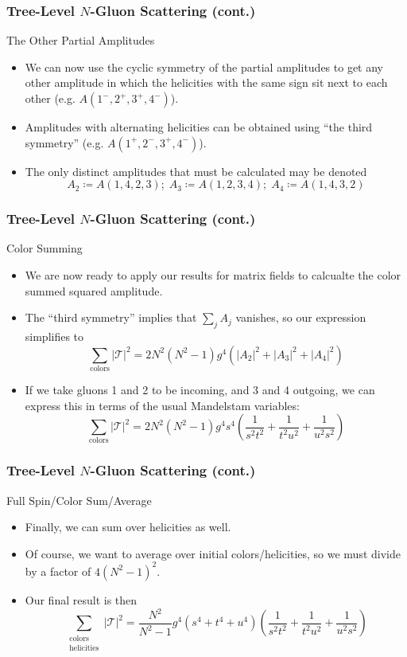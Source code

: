 \documentclass{beamer}
\begin{document}
\begin{frame}
    \frametitle{Tree-Level $N$-Gluon Scattering (cont.)}
    \alert{The Other Partial Amplitudes}
    \begin{itemize}
        \item[\textbullet]<2-> We can now use the cyclic symmetry of the partial amplitudes to get any other amplitude in which the helicities with the same sign sit next to each other (e.g. $A(1^-,2^+,3^+,4^-)$).
        \item[\textbullet]<3-> Amplitudes with alternating helicities can be obtained using ``the third symmetry'' (e.g. $A(1^+,2^-,3^+,4^-)$).
        \item[\textbullet]<4-> The only distinct amplitudes that must be calculated may be denoted \[ A_2 \coloneqq A(1,4,2,3); \; A_3 \coloneqq A(1,2,3,4); \; A_4 \coloneqq A(1,4,3,2) \]  
    \end{itemize}
\end{frame}

\begin{frame}
    \frametitle{Tree-Level $N$-Gluon Scattering (cont.)}
    \alert{Color Summing}
    \begin{itemize}
        \item[\textbullet]<2-> We are now ready to apply our results for matrix fields to calcualte the color summed squared amplitude.
        \item[\textbullet]<3-> The ``third symmetry'' implies that $\sum_jA_j$ vanishes, so our expression simplifies to \[ \sum_{\text{colors}}|\mathcal{T}|^2 = 2N^2(N^2 - 1)g^4\left(|A_2|^2 + |A_3|^2 + |A_4|^2\right) \]
        \item[\textbullet]<4-> If we take gluons 1 and 2 to be incoming, and 3 and 4 outgoing, we can express this in terms of the usual Mandelstam variables: \[ \sum_{\text{colors}}|\mathcal{T}|^2 = 2N^2(N^2 - 1)g^4s^4\left(\frac{1}{s^2t^2} + \frac{1}{t^2u^2} + \frac{1}{u^2s^2}\right) \]
    \end{itemize}
\end{frame}

\begin{frame}
    \frametitle{Tree-Level $N$-Gluon Scattering (cont.)}
    \alert{Full Spin/Color Sum/Average}
    \begin{itemize}
        \item[\textbullet]<2-> Finally, we can sum over helicities as well.
        \item[\textbullet]<3-> Of course, we want to average over initial colors/helicities, so we must divide by a factor of $4(N^2 - 1)^2$.
        \item[\textbullet]<4-> Our final result is then \[ \boxed{\sum_{\substack{\text{colors}\\\text{helicities}}} |\mathcal{T}|^2 = \frac{N^2}{N^2 - 1}g^4(s^4 + t^4 + u^4)\left(\frac{1}{s^2t^2} + \frac{1}{t^2u^2} + \frac{1}{u^2s^2}\right) } \] 
    \end{itemize}
\end{frame}
\end{document}
